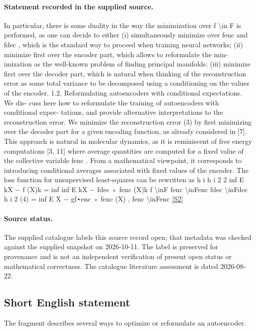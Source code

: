 \documentclass[11pt]{article}
\newcommand{\sref}[2]{\hyperlink{source:#1:#2}{[S#2]}}
\begin{document}
\paragraph{Statement recorded in the supplied source.}
In particular, there is some duality in the way the minimization over f \textbackslash{}in F is performed, as one can decide to either (i) simultaneously minimize over fenc and fdec , which is the standard way to proceed when training neural networks; (ii) minimize first over the encoder part, which allows to reformulate the min- imization as the well-known problem of finding principal manifolds; (iii) minimize first over the decoder part, which is natural when thinking of the reconstruction error as some total variance to be decomposed using a conditioning on the values of the encoder. 1.2. Reformulating autoencoders with conditional expectations. We dis- cuss here how to reformulate the training of autoencoders with conditional expec- tations, and provide alternative interpretations to the reconstruction error. We minimize the reconstruction error (3) by first minimizing over the decoder part for a given encoding function, as already considered in [7]. This approach is natural in molecular dynamics, as it is reminiscent of free energy computations [3, 11] where average quantities are computed for a fixed value of the collective variable fenc . From a mathematical viewpoint, it corresponds to introducing conditional averages associated with fixed values of the encoder. The loss function for unsupervised least-squares can be rewritten as h i h i 2 2 inf E kX − f (X)k = inf inf E kX − fdec ◦ fenc (X)k f \textbackslash{}inF fenc \textbackslash{}inFenc fdec \textbackslash{}inFdec h i 2 (4) = inf E X − gf⋆enc ◦ fenc (X) , fenc \textbackslash{}inFenc \sref{statement}{2}
\paragraph{Source status.}
The supplied catalogue labels this source record open; that metadata was checked against the supplied snapshot on 2026-10-11. The label is preserved for provenance and is not an independent verification of present open status or mathematical correctness. The catalogue literature assessment is dated 2026-08-22.
\subsection{Short English statement}
The fragment describes several ways to optimize or reformulate an autoencoder.
\end{document}
